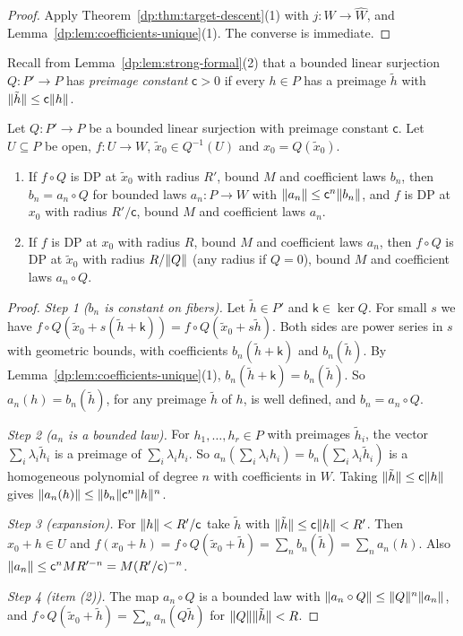 \begin{proof}
Apply Theorem~\ref{dp:thm:target-descent}(1) with $j\colon W\to\widehat W$, and Lemma~\ref{dp:lem:coefficients-unique}(1). The converse is immediate.
\end{proof}

Recall from Lemma~\ref{dp:lem:strong-formal}(2) that a bounded linear surjection $Q\colon P'\to P$ has \emph{preimage constant} $\mathsf c>0$ if every $h\in P$ has a preimage $\tilde h$ with $\lVert \tilde h\rVert\le\mathsf c\lVert h\rVert$.

\begin{proposition}\label{dp:prop:source-descent}
Let $Q\colon P'\to P$ be a bounded linear surjection with preimage constant $\mathsf c$. Let $U\subseteq P$ be open, $f\colon U\to W$, $\tilde x_0\in Q^{-1}(U)$ and $x_0=Q(\tilde x_0)$.
\begin{enumerate}
\item If $f\circ Q$ is DP at $\tilde x_0$ with radius $R'$, bound $M$ and coefficient laws $b_n$, then $b_n=a_n\circ Q$ for bounded laws $a_n\colon P\to W$ with $\lVert a_n\rVert\le\mathsf c^n\lVert b_n\rVert$, and $f$ is DP at $x_0$ with radius $R'/\mathsf c$, bound $M$ and coefficient laws $a_n$.
\item If $f$ is DP at $x_0$ with radius $R$, bound $M$ and coefficient laws $a_n$, then $f\circ Q$ is DP at $\tilde x_0$ with radius $R/\lVert Q\rVert$ (any radius if $Q=0$), bound $M$ and coefficient laws $a_n\circ Q$.
\end{enumerate}
\end{proposition}

\begin{proof}
\emph{Step 1 ($b_n$ is constant on fibers).} Let $\tilde h\in P'$ and $\mathsf k\in\ker Q$. For small $s$ we have $f\circ Q(\tilde x_0+s(\tilde h+\mathsf k))=f\circ Q(\tilde x_0+s\tilde h)$. Both sides are power series in $s$ with geometric bounds, with coefficients $b_n(\tilde h+\mathsf k)$ and $b_n(\tilde h)$. By Lemma~\ref{dp:lem:coefficients-unique}(1), $b_n(\tilde h+\mathsf k)=b_n(\tilde h)$. So $a_n(h)=b_n(\tilde h)$, for any preimage $\tilde h$ of $h$, is well defined, and $b_n=a_n\circ Q$.

\emph{Step 2 ($a_n$ is a bounded law).} For $h_1,\dots,h_r\in P$ with preimages $\tilde h_i$, the vector $\sum_i\lambda_i\tilde h_i$ is a preimage of $\sum_i\lambda_ih_i$. So $a_n(\sum_i\lambda_ih_i)=b_n(\sum_i\lambda_i\tilde h_i)$ is a homogeneous polynomial of degree $n$ with coefficients in $W$. Taking $\lVert \tilde h\rVert\le\mathsf c\lVert h\rVert$ gives $\lVert a_n(h)\rVert\le\lVert b_n\rVert\mathsf c^n\lVert h\rVert^n$.

\emph{Step 3 (expansion).} For $\lVert h\rVert<R'/\mathsf c$ take $\tilde h$ with $\lVert \tilde h\rVert\le\mathsf c\lVert h\rVert<R'$. Then $x_0+h\in U$ and $f(x_0+h)=f\circ Q(\tilde x_0+\tilde h)=\sum_nb_n(\tilde h)=\sum_na_n(h)$. Also $\lVert a_n\rVert\le\mathsf c^nMR'^{-n}=M(R'/\mathsf c)^{-n}$.

\emph{Step 4 (item (2)).} The map $a_n\circ Q$ is a bounded law with $\lVert a_n\circ Q\rVert\le\lVert Q\rVert^n\lVert a_n\rVert$, and $f\circ Q(\tilde x_0+\tilde h)=\sum_na_n(Q\tilde h)$ for $\lVert Q\rVert\lVert \tilde h\rVert<R$.
\end{proof}

